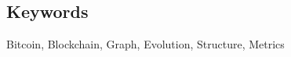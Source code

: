 \documentclass[letterpaper,twocolumn,10pt]{article}
\begin{document}
\subsection*{Keywords}
Bitcoin, Blockchain, Graph, Evolution, Structure, Metrics


 





 


{\footnotesize 
	
	
}

\end{document}
